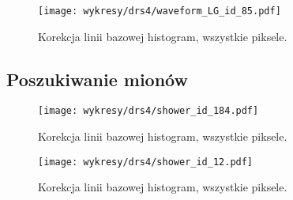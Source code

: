 \documentclass[a4paper,11pt,twoside]{article}
\begin{document}
\begin{figure}[H] 
\centering
\texttt{[image: wykresy/drs4/waveform\_LG\_id\_85.pdf]}
\caption{Korekcja linii bazowej histogram, wszystkie piksele.}
\label{fig:muon_image}
\end{figure}

\subsection{Poszukiwanie mionów}
\begin{figure}[H] 
\centering
\texttt{[image: wykresy/drs4/shower\_id\_184.pdf]}
\caption{Korekcja linii bazowej histogram, wszystkie piksele.}
\label{fig:muon_image}
\end{figure}

\begin{figure}[H] 
\centering
\texttt{[image: wykresy/drs4/shower\_id\_12.pdf]}
\caption{Korekcja linii bazowej histogram, wszystkie piksele.}
\label{fig:muon_image}
\end{figure}
\newpage
\end{document}
